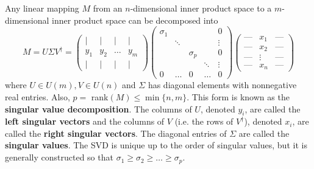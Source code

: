   \begin{theorem}
    Any linear mapping $M$ from an $n$-dimensional inner product space to a $m$-dimensional inner product space can be decomposed into 
    \begin{equation}
      M = U \Sigma V^\dagger = \begin{pmatrix}
       \vert & \vert & \vert & \vert\\
      y_1 & y_2 & \ldots & y_m \\
      \vert & \vert & \vert & \vert
      \end{pmatrix}\begin{pmatrix}
      \sigma_1 & & & &0\\
      &\ddots &&& \vdots \\
      & & \sigma_p & & 0\\
      & & & \ddots &\vdots \\
      0 & \ldots &0& \ldots &0
      \end{pmatrix} \begin{pmatrix}
      \text{---}&x_1&\text{---} \\
      \text{---}&x_2&\text{---} \\
      \text{---}&\vdots&\text{---} \\
      \text{---}&x_n&\text{---}
      \end{pmatrix}
    \end{equation}
    where $U \in U(m), V \in U(n)$ and $\Sigma$ has diagonal elements with nonnegative real entries. Also, $p = $ rank$(M) \leq \min{\{n,m\}}$. This form is known as the \textbf{singular value decomposition}. The columns of $U$, denoted $y_i$, are called the \textbf{left singular vectors} and the columns of $V$ (i.e. the rows of $V^\dagger$), denoted $x_i$, are called the \textbf{right singular vectors}. The diagonal entries of $\Sigma$ are called the \textbf{singular values}. The SVD is unique up to the order of singular values, but it is generally constructed so that $\sigma_1 \geq \sigma_2 \geq \ldots \geq \sigma_p$. 
  \end{theorem}

